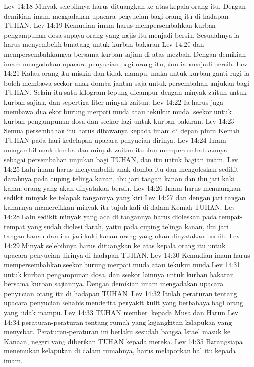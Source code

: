 Lev 14:18  Minyak selebihnya harus dituangkan ke atas kepala orang itu. Dengan demikian imam mengadakan upacara penyucian bagi orang itu di hadapan TUHAN.
Lev 14:19  Kemudian imam harus mempersembahkan kurban pengampunan dosa supaya orang yang najis itu menjadi bersih. Sesudahnya ia harus menyembelih binatang untuk kurban bakaran
Lev 14:20  dan mempersembahkannya bersama kurban sajian di atas mezbah. Dengan demikian imam mengadakan upacara penyucian bagi orang itu, dan ia menjadi bersih.
Lev 14:21  Kalau orang itu miskin dan tidak mampu, maka untuk kurban ganti rugi ia boleh membawa seekor anak domba jantan saja untuk persembahan unjukan bagi TUHAN. Selain itu satu kilogram tepung dicampur dengan minyak zaitun untuk kurban sajian, dan sepertiga liter minyak zaitun.
Lev 14:22  Ia harus juga membawa dua ekor burung merpati muda atau tekukur muda: seekor untuk kurban pengampunan dosa dan seekor lagi untuk kurban bakaran.
Lev 14:23  Semua persembahan itu harus dibawanya kepada imam di depan pintu Kemah TUHAN pada hari kedelapan upacara penyucian dirinya.
Lev 14:24  Imam mengambil anak domba dan minyak zaitun itu dan mempersembahkannya sebagai persembahan unjukan bagi TUHAN, dan itu untuk bagian imam.
Lev 14:25  Lalu imam harus menyembelih anak domba itu dan mengoleskan sedikit darahnya pada cuping telinga kanan, ibu jari tangan kanan dan ibu jari kaki kanan orang yang akan dinyatakan bersih.
Lev 14:26  Imam harus menuangkan sedikit minyak ke telapak tangannya yang kiri
Lev 14:27  dan dengan jari tangan kanannya memercikkan minyak itu tujuh kali di dalam Kemah TUHAN.
Lev 14:28  Lalu sedikit minyak yang ada di tangannya harus dioleskan pada tempat-tempat yang sudah diolesi darah, yaitu pada cuping telinga kanan, ibu jari tangan kanan dan ibu jari kaki kanan orang yang akan dinyatakan bersih.
Lev 14:29  Minyak selebihnya harus dituangkan ke atas kepala orang itu untuk upacara penyucian dirinya di hadapan TUHAN.
Lev 14:30  Kemudian imam harus mempersembahkan seekor burung merpati muda atau tekukur muda
Lev 14:31  untuk kurban pengampunan dosa, dan seekor lainnya untuk kurban bakaran bersama kurban sajiannya. Dengan demikian imam mengadakan upacara penyucian orang itu di hadapan TUHAN.
Lev 14:32  Itulah peraturan tentang upacara penyucian sehabis menderita penyakit kulit yang berbahaya bagi orang yang tidak mampu.
Lev 14:33  TUHAN memberi kepada Musa dan Harun
Lev 14:34  peraturan-peraturan tentang rumah yang kejangkitan kelapukan yang menyebar. Peraturan-peraturan ini berlaku sesudah bangsa Israel masuk ke Kanaan, negeri yang diberikan TUHAN kepada mereka.
Lev 14:35  Barangsiapa menemukan kelapukan di dalam rumahnya, harus melaporkan hal itu kepada imam.
